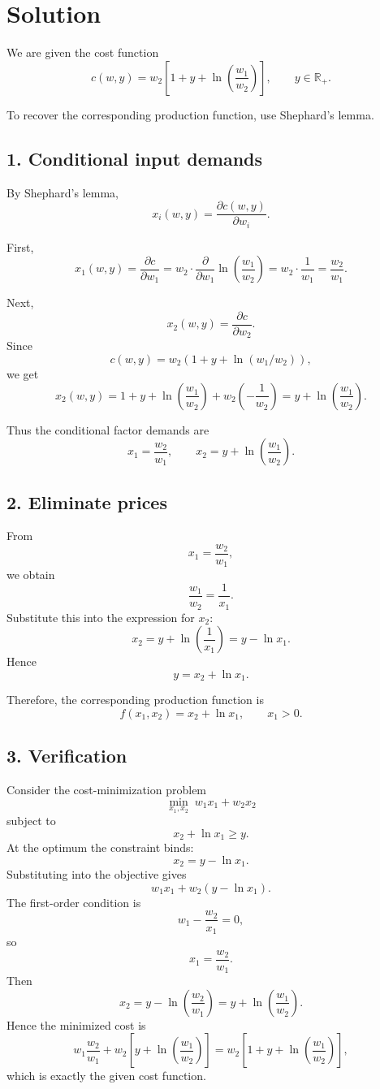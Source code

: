 \section*{Solution}

We are given the cost function
\[
c(w,y)=w_2\left[1+y+\ln\left(\frac{w_1}{w_2}\right)\right],
\qquad y\in \mathbb{R}_+.
\]

To recover the corresponding production function, use Shephard's lemma.

\subsection*{1. Conditional input demands}

By Shephard's lemma,
\[
x_i(w,y)=\frac{\partial c(w,y)}{\partial w_i}.
\]

First,
\[
x_1(w,y)=\frac{\partial c}{\partial w_1}
=
w_2 \cdot \frac{\partial}{\partial w_1}\ln\left(\frac{w_1}{w_2}\right)
=
w_2\cdot \frac{1}{w_1}
=
\frac{w_2}{w_1}.
\]

Next,
\[
x_2(w,y)=\frac{\partial c}{\partial w_2}.
\]
Since
\[
c(w,y)=w_2(1+y+\ln(w_1/w_2)),
\]
we get
\[
x_2(w,y)
=
1+y+\ln\left(\frac{w_1}{w_2}\right)
+
w_2\left(-\frac{1}{w_2}\right)
=
y+\ln\left(\frac{w_1}{w_2}\right).
\]

Thus the conditional factor demands are
\[
x_1=\frac{w_2}{w_1},
\qquad
x_2=y+\ln\left(\frac{w_1}{w_2}\right).
\]

\subsection*{2. Eliminate prices}

From
\[
x_1=\frac{w_2}{w_1},
\]
we obtain
\[
\frac{w_1}{w_2}=\frac{1}{x_1}.
\]
Substitute this into the expression for \(x_2\):
\[
x_2
=
y+\ln\left(\frac{1}{x_1}\right)
=
y-\ln x_1.
\]
Hence
\[
y=x_2+\ln x_1.
\]

Therefore, the corresponding production function is
\[
\boxed{
f(x_1,x_2)=x_2+\ln x_1,
\qquad x_1>0.
}
\]

\subsection*{3. Verification}

Consider the cost-minimization problem
\[
\min_{x_1,x_2}\; w_1x_1+w_2x_2
\]
subject to
\[
x_2+\ln x_1\ge y.
\]
At the optimum the constraint binds:
\[
x_2=y-\ln x_1.
\]
Substituting into the objective gives
\[
w_1x_1+w_2(y-\ln x_1).
\]
The first-order condition is
\[
w_1-\frac{w_2}{x_1}=0,
\]
so
\[
x_1=\frac{w_2}{w_1}.
\]
Then
\[
x_2=y-\ln\left(\frac{w_2}{w_1}\right)
=
y+\ln\left(\frac{w_1}{w_2}\right).
\]
Hence the minimized cost is
\[
w_1\frac{w_2}{w_1}
+
w_2\left[y+\ln\left(\frac{w_1}{w_2}\right)\right]
=
w_2\left[1+y+\ln\left(\frac{w_1}{w_2}\right)\right],
\]
which is exactly the given cost function.

